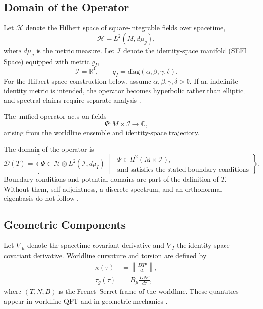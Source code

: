 \documentclass[aip,jmp,reprint,onecolumn,nofootinbib]{revtex4-2}
\begin{document}
\subsection{Domain of the Operator}

Let $\mathcal{H}$ denote the Hilbert space of square-integrable fields over spacetime,
\begin{equation}
\mathcal{H} = L^2(M,d\mu_g),
\end{equation}
where $d\mu_g$ is the metric measure. Let $\mathcal{I}$ denote the identity-space manifold 
(SEFI Space) equipped with metric $g_I$,
\begin{equation}
\mathcal{I} = \mathbb{R}^4, \qquad
g_I = \mathrm{diag}(\alpha,\beta,\gamma,\delta).
\end{equation}
For the Hilbert-space construction below, assume $\alpha,\beta,\gamma,\delta>0$. If an 
indefinite identity metric is intended, the operator becomes hyperbolic rather than elliptic, 
and spectral claims require separate analysis \cite{CourantHilbert}.

The unified operator acts on fields
\begin{equation}
\Psi : M \times \mathcal{I} \to \mathbb{C},
\end{equation}
arising from the worldline ensemble and identity-space trajectory.

The domain of the operator is
\begin{equation}
\mathcal{D}(T) = \left\{
\Psi \in \mathcal{H} \otimes L^2(\mathcal{I},d\mu_I)
\;\middle|\;
\begin{gathered}
\Psi \in H^2(M\times\mathcal{I}),\\
\text{and satisfies the stated boundary conditions}
\end{gathered}
\right\}.
\end{equation}
Boundary conditions and potential domains are part of the definition of $T$. Without them, 
self-adjointness, a discrete spectrum, and an orthonormal eigenbasis do not follow 
\cite{ReedSimon}.

\subsection{Geometric Components}

Let $\nabla_\mu$ denote the spacetime covariant derivative and $\nabla_I$ the identity-space 
covariant derivative. Worldline curvature and torsion are defined by
\begin{align}
\kappa(\tau) &= \left\| \frac{D T^\mu}{d\tau} \right\|, \\
\tau_g(\tau) &= B_\mu \frac{D N^\mu}{d\tau},
\end{align}
where $(T,N,B)$ is the Frenet--Serret frame of the worldline. These quantities appear in 
worldline QFT \cite{Polyakov1987,Schubert2001} and in geometric mechanics 
\cite{ArnoldMechanics}.
\end{document}
